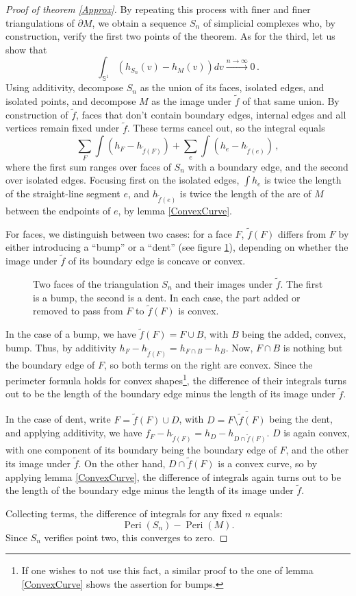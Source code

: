 \documentclass[10pt,a4paper]{amsart}
\newcommand{\Peri}{\operatorname{Peri}}
\newcommand{\bb}{\mathbb}
\begin{document}
\begin{proof}[Proof of theorem \ref{Approx}]
	By repeating this process with finer and finer triangulations of $\partial M$, we obtain a sequence $S_n$ of simplicial complexes who, by construction, verify the first two points of the theorem. As for the third, let us show that
	\[ \int_{\bb S^{1}} (h_{S_n}(v)-h_{M}(v))  dv \overset{n \to \infty} \longrightarrow 0\, .\]
	Using additivity, decompose $S_n$ as the union of its faces, isolated edges, and isolated points, and decompose $M$ as the image under $\tilde f$ of that same union. By construction of $\tilde f$, faces that don't contain boundary edges, internal edges and all vertices remain fixed under $\tilde f$. These terms cancel out, so the integral equals
	\[ \sum_{F} \int(h_F -h_{\tilde f(F)}) + \sum_{e} \int(h_e -h_{\tilde f(e)})\, , \]
	where the first sum ranges over faces of $S_n$ with a boundary edge, and the second over isolated edges. Focusing first on the isolated edges, $\int h_e$ is twice the length of the straight-line segment $e$, and $h_{\tilde f(e)}$ is twice the length of the arc of $M$ between the endpoints of $e$, by lemma \ref{ConvexCurve}.
	
	For faces, we distinguish between two cases: for a face $F$, $\tilde f(F)$ differs from $F$ by either introducing a ``bump'' or a ``dent'' (see figure \ref{BumpDent}), depending on whether the image under $\tilde f $ of its boundary edge is concave or convex.
	\begin{figure}
		\centering
	
	\caption{Two faces of the triangulation $S_n$ and their images under $\tilde f$. The first is a bump, the second is a dent. In each case, the part added or removed to pass from $F$ to $\tilde f(F)$ is convex.}
	\label{BumpDent}
	\end{figure}
	In the case of a bump, we have $\tilde f(F)= F \cup B$, with $B$ being the added, convex, bump. Thus, by additivity $h_F-h_{\tilde f(F)}= h_{F \cap B}-h_B$. Now, $F \cap B$ is nothing but the boundary edge of $F$, so both terms on the right are convex. Since the perimeter formula holds for convex shapes\footnote{If one wishes to not use this fact, a similar proof to the one of lemma \ref{ConvexCurve} shows the assertion for bumps.}, the difference of their integrals turns out to be the length of the boundary edge minus the length of its image under $\tilde f$.
	
	In the case of dent, write $F= \tilde f(F) \cup D$, with $D= \overline{F \setminus \tilde f(F)}$ being the dent, and applying additivity, we have $f_F-h_{\tilde f(F)}= h_D-h_{D \cap \tilde f(F)}$. $D$ is again convex, with one component of its boundary being the boundary edge of $F$, and the other its image under $\tilde f$. On the other hand, $D \cap \tilde f(F)$ is a convex curve, so by applying lemma \ref{ConvexCurve}, the difference of integrals again turns out to be the length of the boundary edge minus the length of its image under $\tilde f$.
	
	Collecting terms, the difference of integrals for any fixed $n$ equals:
	\[\Peri(S_n)-\Peri(M). \]
	Since $S_n$ verifies point two, this converges to zero.
	\end{proof}
\end{document}
